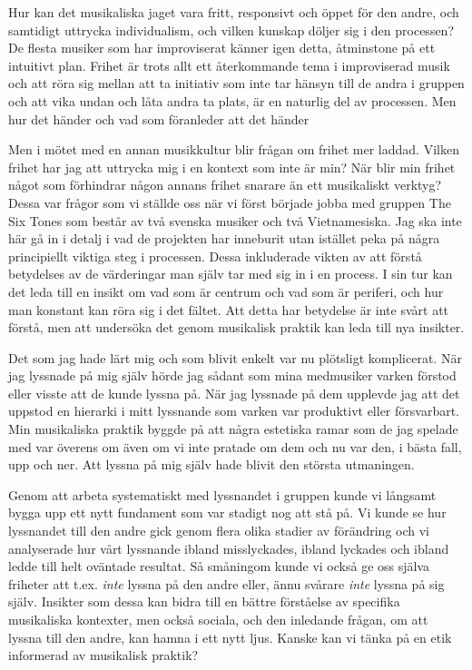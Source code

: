 \documentclass[11pt]{article}
\begin{document}
Hur kan det musikaliska jaget vara fritt, responsivt och öppet för den andre, och samtidigt uttrycka individualism, och vilken kunskap döljer sig i den processen? De flesta musiker som har improviserat känner igen detta, åtminstone på ett intuitivt plan. Frihet är trots allt ett återkommande tema i improviserad musik och att röra sig mellan att ta initiativ som inte tar hänsyn till de andra i gruppen och att vika undan och låta andra ta plats, är en naturlig del av processen. Men hur det händer och vad som föranleder att det händer 

Men i mötet med en annan musikkultur blir frågan om frihet mer laddad. Vilken frihet har jag att uttrycka mig i en kontext som inte är min? När blir min frihet något som förhindrar någon annans frihet snarare än ett musikaliskt verktyg? Dessa var frågor som vi ställde oss när vi först började jobba med gruppen The Six Tones som består av två svenska musiker och två Vietnamesiska. Jag ska inte här gå in i detalj i vad de projekten har inneburit utan istället peka på några principiellt viktiga steg i processen. Dessa inkluderade vikten av att förstå betydelses av de värderingar man själv tar med sig in i en process. I sin tur kan det leda till en insikt om vad som är centrum och vad som är periferi, och hur man konstant kan röra sig i det fältet. Att detta har betydelse är inte svårt att förstå, men att undersöka det genom musikalisk praktik kan leda till nya insikter.

Det som jag hade lärt mig och som blivit enkelt var nu plötsligt komplicerat. När jag lyssnade på mig själv hörde jag sådant som mina medmusiker varken förstod eller visste att de kunde lyssna på. När jag lyssnade på dem upplevde jag att det uppstod en hierarki i mitt lyssnande som varken var produktivt eller försvarbart. Min musikaliska praktik byggde på att några estetiska ramar som de jag spelade med var överens om även om vi inte pratade om dem och nu var den, i bästa fall, upp och ner. Att lyssna på mig själv hade blivit den största utmaningen.

Genom att arbeta systematiskt med lyssnandet i gruppen kunde vi långsamt bygga upp ett nytt fundament som var stadigt nog att stå på. Vi kunde se hur lyssnandet till den andre gick genom flera olika stadier av förändring och vi analyserade hur vårt lyssnande ibland misslyckades, ibland lyckades och ibland ledde till helt oväntade resultat. Så småningom kunde vi också ge oss själva friheter att t.ex. \emph{inte} lyssna på den andre eller, ännu svårare \emph{inte} lyssna på sig själv. Insikter som dessa kan bidra till en bättre förståelse av specifika musikaliska kontexter, men också sociala, och den inledande frågan, om att lyssna till den andre, kan hamna i ett nytt ljus. Kanske kan vi tänka på en etik informerad av musikalisk praktik?
\end{document}
